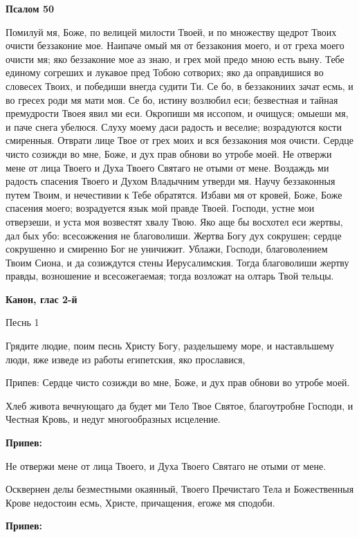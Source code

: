 \medskip
\bfseries Псалом 50\normalfont{}


Помилуй мя, Боже, по велицей милости Твоей, и по множеству щедрот Твоих очисти беззаконие мое. Наипаче омый мя от беззакония моего, и от греха моего очисти мя; яко беззаконие мое аз знаю, и грех мой предо мною есть выну. Тебе единому согреших и лукавое пред Тобою сотворих; яко да оправдишися во словесех Твоих, и победиши внегда судити Ти. Се бо, в беззакониих зачат есмь, и во гресех роди мя мати моя. Се бо, истину возлюбил еси; безвестная и тайная премудрости Твоея явил ми еси. Окропиши мя иссопом, и очищуся; омыеши мя, и паче снега убелюся. Слуху моему даси радость и веселие; возрадуются кости смиренныя. Отврати лице Твое от грех моих и вся беззакония моя очисти. Сердце чисто созижди во мне, Боже, и дух прав обнови во утробе моей. Не отвержи мене от лица Твоего и Духа Твоего Святаго не отыми от мене. Воздаждь ми радость спасения Твоего и Духом Владычним утверди мя. Научу беззаконныя путем Твоим, и нечестивии к Тебе обратятся. Избави мя от кровей, Боже, Боже спасения моего; возрадуется язык мой правде Твоей. Господи, устне мои отверзеши, и уста моя возвестят хвалу Твою. Яко аще бы восхотел еси жертвы, дал бых убо: всесожжения не благоволиши. Жертва Богу дух сокрушен; сердце сокрушенно и смиренно Бог не уничижит. Ублажи, Господи, благоволением Твоим Сиона, и да созиждутся стены Иерусалимския. Тогда благоволиши жертву правды, возношение и всесожегаемая; тогда возложат на олтарь Твой тельцы.




\medskip
\bfseries Канон, глас 2-й
\normalfont{}

\medskip
Песнь 1


Грядите людие, поим песнь Христу Богу, раздельшему море, и наставльшему люди, яже изведе из работы египетския, яко прославися,


Припев: Сердце чисто созижди во мне, Боже, и дух прав обнови во утробе моей.


Хлеб живота вечнующаго да будет ми Тело Твое Святое, благоутробне Господи, и Честная Кровь, и недуг многообразных исцеление.


\medskip
\bfseries Припев:\normalfont{} 


Не отвержи мене от лица Твоего, и Духа Твоего Святаго не отыми от мене.


Осквернен делы безместными окаянный, Твоего Пречистаго Тела и Божественныя Крове недостоин есмь, Христе, причащения, егоже мя сподоби.


\medskip
\bfseries Припев:\normalfont{} 


